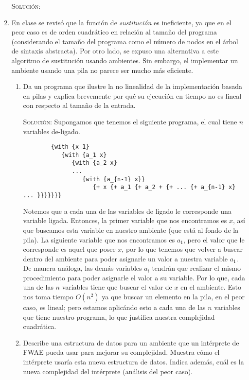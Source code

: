 \documentclass[letterpaper,11pt]{article}
\begin{document}
\begin{enumerate}
   \textsc{Solución:}

   \item En clase se revisó que la función de \textit{sustitución} es 
   ineficiente, ya que en el peor caso es de orden cuadrático en relación 
   al tamaño del programa (considerando el tamaño del programa como el 
   número de nodos en el árbol de sintaxis abstracta). Por otro lado, se 
   expuso una alternativa a este algoritmo de sustitución usando 
   ambientes. Sin embargo, el implementar un ambiente usando una pila no 
   parece ser mucho más eficiente.
   \begin{enumerate}
        \item Da un programa que ilustre la no linealidad de la implementación
        basada en pilas y explica brevemente por qué su ejecución en tiempo no
        es lineal con respecto al tamaño de la entrada.

        \textsc{Solución:} Supongamos que tenemos el siguiente programa, el 
        cual tiene $n$ variables de-ligado.
        \begin{verbatim}
        {with {x 1} 
           {with {a_1 x} 
              {with {a_2 x} 
              ...
                 {with {a_{n-1} x}} 
                    {+ x {+ a_1 {+ a_2 + {+ ... {+ a_{n-1} x} ... }}}}}}}
        \end{verbatim}

        Notemos que a cada una de las variables de ligado le corresponde una 
        variable ligada. Entonces, la primer variable que nos encontramos es
        $x$, así que buscamos esta variable en nuestro ambiente (que está al 
        fondo de la pila). La siguiente variable que nos encontramos es 
        \texttt{$a_1$}, pero el valor que le corresponde es aquel que posee 
        $x$, por lo que tenemos que volver a buscar dentro del ambiente 
        para poder asignarle un valor a nuestra variable \texttt{$a_1$}. 
        De manera análoga, las demás variables $a_i$ tendrán que realizar el 
        mismo procedimiento para poder asignarle el valor a su variable. 
        Por lo que, cada una de las $n$ variables tiene que buscar el valor 
        de $x$ en el ambiente. Esto nos toma tiempo $O(n^2)$ ya que buscar 
        un elemento en la pila, en el peor caso, es lineal; pero estamos 
        aplicándo esto a cada una de las $n$ variables que tiene nuestro 
        programa, lo que justifica nuestra complejidad cuadrática. 

        \item Describe una estructura de datos para un ambiente que un 
        intérprete de FWAE pueda usar para mejorar su complejidad. Muestra 
        cómo el intérprete usaría esta nueva estructura de datos. Indica 
        además, cuál es la nueva complejidad del intérprete (análisis del 
        peor caso).


\end{enumerate}
\end{enumerate}
\end{document}
